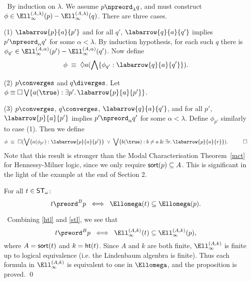 \proof\ By induction on $\lambda$.
We assume $ p \npreord_{\lambda} q$, and must construct $\phi \in {\Ell}^{(A, \lambda )}_{\infty}(p) - {\Ell}^{(A, \lambda )}_{\infty}(q)$.
There are three cases.

\noindent (1) $\labarrow{p}{a}{p'}$ and for all $q'$, $\labarrow{q}{a}{q'}$ implies $p' \npreord_{\alpha} q'$ for some $\alpha < \lambda$.
By induction hypothesis, for each such $q$ there is $\phi_{q'} \in {\Ell}^{(A, \alpha )}_{\infty}(p') - {\Ell}^{(A, \alpha )}_{\infty}(q')$.
Now define
\[ \phi \; \equiv \; \Diamond a ( \bigwedge \{ \phi_{q'} : \labarrow{q}{a}{q'} \} ) . \]

\noindent (2) $p \converges$ and $q \diverges$.
Let $\phi \equiv \Box \bigvee \{ a(\true ) : \exists p' . \, \labarrow{p}{a}{p'} \}$.

\noindent (3) $p \converges$, $q \converges$, $\labarrow{q}{a}{q'}$, and for all $p'$, $\labarrow{p}{a}{p'}$ implies $p' \npreord_{\alpha} q'$ for some $\alpha < \lambda$.
Define $\phi_{p'}$ similarly to case (1). Then we define
\[ \phi \; \equiv \; \Box ( \bigvee \{ a(\phi_{p'}) : \labarrow{p}{a}{p'} \} \; \vee \; \bigvee \{ b(\true ) : b \not= a \: \& \: \exists r . \, \labarrow{p}{a}{r} \} ) . \;\;\; \qed \]
Note that this result is stronger than the Modal Characterisation Theorem~\ref{mct} for Hennessy-Milner logic, since we only require ${\sf sort}(p) \subseteq A$.
This is significant in the light of the example at the end of Section 2.

\begin{proposition}
\label{finbis}
For all $t \in {\sf ST}_{\omega}$:
\[ t \preord^{B} p \;\; \Longleftrightarrow \;\; {\Ellomega}(t) \subseteq {\Ellomega}(p) . \]
\end{proposition}

\proof\ Combining \ref{htl} and \ref{stl}, we see that
\[ t \preord^{B} p \;\; \Longleftrightarrow \;\; {\Ell}^{(A, k )}_{\infty}(t)  \subseteq {\Ell}^{(A, k )}_{\infty}(p) , \]
where $A = {\sf sort}(t)$ and $k = {\sf ht}(t)$.
Since $A$ and $k$ are both finite, $ {\Ell}^{(A, k )}_{\infty}$ is finite up to logical equivalence (i.e. the Lindenbaum algenbra is finite).
Thus each formula in $ {\Ell}^{(A, k )}_{\infty}$ is equivalent to one in $\Ellomega$, and the proposition is proved. \qed


